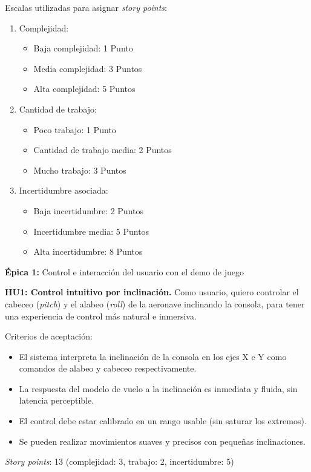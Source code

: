 \documentclass[
11pt, %
]{charter}
\begin{document}
Escalas utilizadas para asignar \textit{story points}:
\begin{enumerate}
	\item Complejidad:
	\begin{itemize}
		\item Baja complejidad: 1 Punto
		\item Media complejidad: 3 Puntos
		\item Alta complejidad: 5 Puntos
	\end{itemize}
	\item Cantidad de trabajo:
	\begin{itemize}
		\item Poco trabajo: 1 Punto
		\item Cantidad de trabajo media: 2 Puntos
		\item Mucho trabajo: 3 Puntos
	\end{itemize}
	\item Incertidumbre asociada:
	\begin{itemize}
		\item  Baja incertidumbre: 2 Puntos
		\item  Incertidumbre media: 5 Puntos
		\item  Alta incertidumbre: 8 Puntos
	\end{itemize}
\end{enumerate}

\textbf{Épica 1:} Control e interacción del usuario con el demo de juego

	\textbf{HU1: Control intuitivo por inclinación.} Como usuario, quiero controlar el cabeceo (\textit{pitch}) y el alabeo (\textit{roll}) de la aeronave inclinando la consola, para tener una experiencia de control más natural e inmersiva.

	Criterios de aceptación:
	\begin{itemize}
		\item El sistema interpreta la inclinación de la consola en los ejes X e Y como comandos de alabeo y cabeceo respectivamente.
		\item La respuesta del modelo de vuelo a la inclinación es inmediata y fluida, sin latencia perceptible.
		\item El control debe estar calibrado en un rango usable (sin saturar los extremos).
		\item Se pueden realizar movimientos suaves y precisos con pequeñas inclinaciones.
	\end{itemize}
	\textit{Story points}: 13 (complejidad: 3, trabajo: 2, incertidumbre: 5)
\end{document}
